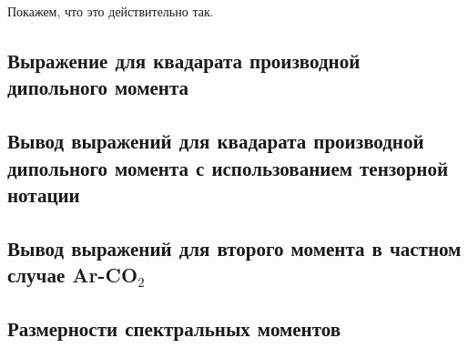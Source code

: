 \par
Покажем, что это действительно так.
\subsection{Выражение для квадарата производной дипольного момента}

\subsection{Вывод выражений для квадарата производной дипольного момента с использованием тензорной нотации}


\subsection{Вывод выражений для второго момента в частном случае Ar-CO${}_2$}

\subsection{Размерности спектральных моментов}



